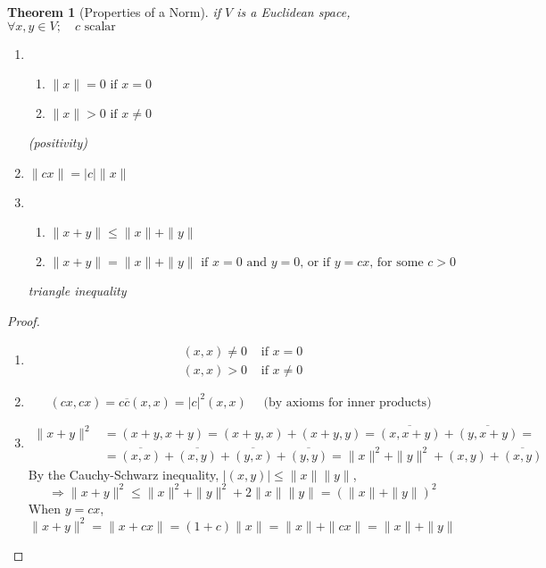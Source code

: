 \documentclass[twoside]{amsart}
\theoremstyle{plain}
\newtheorem{theorem}{Theorem}
\theoremstyle{definition}
\begin{document}
\begin{theorem}[Properties of a Norm]\label{T:Properties_of_Norm}
  if $V$ is a Euclidean space, $\forall x,y \in V ; \quad c \text{ scalar }$\\
  \begin{enumerate}
  \item 
    \begin{enumerate} 
    \item $ \| x \| = 0 \text{ if } x = 0 $ 
    \item $ \| x \| > 0 \text{ if } x \neq 0 $ 
    \end{enumerate} (positivity) 
  \item $\| c x \| = |c| \| x \| $
  \item
    \begin{enumerate}
    \item $\| x + y \| \leq \| x \| + \| y \| $
    \item $\| x + y \| = \| x \| + \| y \| \text{ if $x=0$ and $y=0$, or if $y=cx$, for some $c>0$ }$
    \end{enumerate} triangle inequality 
  \end{enumerate}
\end{theorem}
\begin{proof}
  \begin{enumerate} 
  \item \begin{align*}
    (x,x) \neq 0 & \text{ if } x = 0 \\ 
    (x,x) > 0 & \text{ if } x \neq 0
  \end{align*}
  \item 
    \[
    (cx, cx) = c\overline{c} (x,x) = |c|^2 (x,x) \quad \text{ (by axioms for inner products) } 
    \]
  \item 
    \begin{align*}
      \| x + y \|^2 & = (x+y, x+y) = (x+y,x) +(x+y,y) = \overline{(x,x+y)} + \overline{ (y,x+y)} = \\
      &= \overline{ (x,x) }+ \overline{ (x,y) } + \overline{ (y,x) } + \overline{ (y,y) } = \| x \|^2 + \| y \|^2 + (x,y) + \overline{ (x,y) } 
    \end{align*}
    By the Cauchy-Schwarz inequality, $|(x,y)| \leq \| x \| \| y \|$, 
    \[
    \Longrightarrow \| x+ y \|^2 \leq \| x \|^2 + \| y \|^2 + 2\|x \| \| y\| = ( \| x \| + \| y \| )^2 
    \]
    When $y=cx$, 
    \[
    \| x + y \|^2 = \| x + cx \| = (1+c )\| x \| = \| x \| + \| c x \| = \| x \| + \| y \|
    \]
  \end{enumerate}
\end{proof}
\end{document}
